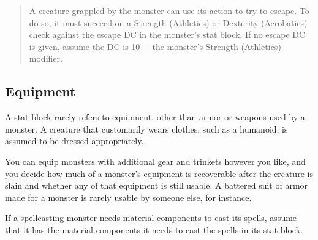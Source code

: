 \documentclass[
]{article}
\begin{document}
\begin{quote}
A creature grappled by the monster can use its action to try to escape.
To do so, it must succeed on a Strength (Athletics) or Dexterity
(Acrobatics) check against the escape DC in the monster's stat block. If
no escape DC is given, assume the DC is 10 + the monster's Strength
(Athletics) modifier.
\end{quote}

\hypertarget{equipment}{%
\subsection{Equipment}\label{equipment}}

A stat block rarely refers to equipment, other than armor or weapons
used by a monster. A creature that customarily wears clothes, such as a
humanoid, is assumed to be dressed appropriately.

You can equip monsters with additional gear and trinkets however you
like, and you decide how much of a monster's equipment is recoverable
after the creature is slain and whether any of that equipment is still
usable. A battered suit of armor made for a monster is rarely usable by
someone else, for instance.

If a spellcasting monster needs material components to cast its spells,
assume that it has the material components it needs to cast the spells
in its stat block.
\end{document}
